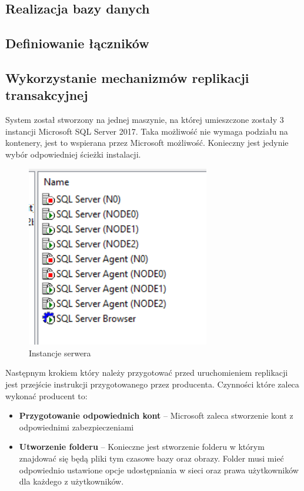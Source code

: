 \documentclass{article}
\begin{document}
	\subsection{Realizacja bazy danych}
	\newpage
	\subsection{Definiowanie łączników}
	\newpage
	\subsection{Wykorzystanie mechanizmów replikacji transakcyjnej}
System został stworzony na jednej maszynie, na której umieszczone zostały 3 instancji Microsoft SQL Server 2017. Taka możliwość nie wymaga podziału na kontenery, jest to wspierana przez Microsoft możliwość. Konieczny jest jedynie wybór odpowiedniej ścieżki instalacji.
	
	\begin{figure}[hbt!]
		\includegraphics[width=8cm]{Files/Pictures/instancje}
		\centering
		\caption{Instancje serwera}
	\end{figure}
	

	
	Następnym krokiem który należy przygotować przed uruchomieniem replikacji jest przejście instrukcji przygotowanego przez producenta. Czynności które zaleca wykonać producent to:
	
	\begin{itemize}
	\item	\textbf{Przygotowanie odpowiednich kont} – Microsoft zaleca stworzenie kont z odpowiednimi zabezpieczeniami
	\item	\textbf{Utworzenie folderu} – Konieczne jest stworzenie folderu w którym znajdować się będą 	pliki tym czasowe bazy oraz obrazy. Folder musi mieć odpowiednio ustawione opcje udostępniania w sieci oraz prawa użytkowników dla każdego z użytkowników.
	\end{itemize}
	
\end{document}
